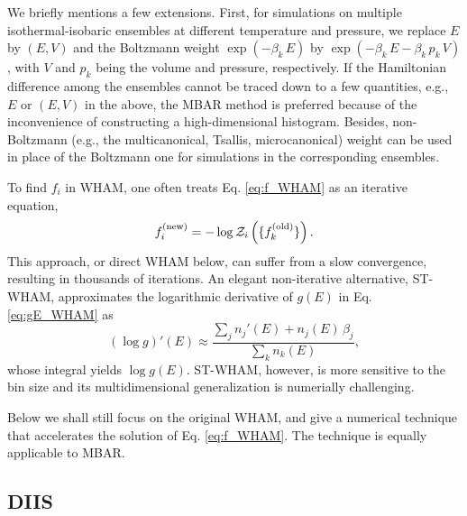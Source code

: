 \documentclass[reprint,superscriptaddress]{revtex4-1}
\begin{document}
We briefly mentions a few extensions.
%
First,
for simulations
on multiple isothermal-isobaric ensembles
at different temperature and pressure,
%
we replace $E$ by $(E, V)$
and the Boltzmann weight
$\exp(-\beta_k \, E)$
by
$\exp(-\beta_k \, E - \beta_k \, p_k \, V)$,
with
$V$ and $p_k$
being the volume and pressure,
respectively.
%
If the Hamiltonian difference among the ensembles
cannot be traced down to a few quantities,
e.g., $E$ or $(E, V)$ in the above,
the MBAR method is preferred\cite{
shirts2008}
because of the inconvenience
of constructing a high-dimensional histogram.
%
Besides,
non-Boltzmann
(e.g., the multicanonical\cite{
mezei1987, *berg1992, *lee1993},
Tsallis\cite{tsallis1988},
microcanonical\cite{
yan2003, *martin-mayor2007, *zhang2013})
weight
can be used in place of the Boltzmann one
for simulations in the corresponding ensembles.
%



To find $f_i$ in WHAM,
one often treats Eq. \eqref{eq:f_WHAM}
as an iterative equation,
%
\begin{equation*}
f_i^\mathrm{(new)}
=
-\log \mathcal{Z}_i\left(
  \{ f_k^\mathrm{(old)} \}
\right).
\end{equation*}
%
This approach, or direct WHAM below,
can suffer from a slow convergence,
resulting in thousands of iterations\cite{
bereau2009, kim2011}.
%
An elegant non-iterative alternative, ST-WHAM,
approximates the logarithmic derivative of $g(E)$
in Eq. \eqref{eq:gE_WHAM} as\cite{
kim2011}
%
\begin{equation}
(\log g)'(E)
\approx
\frac{
  \sum_j n_j'(E) + n_j(E) \, \beta_j
}
{
  \sum_k n_k(E)
},
\label{eq:beta_STWHAM}
\end{equation}
%
whose integral yields $\log g(E)$.
%
ST-WHAM, however,
is more sensitive to the bin size
and its multidimensional generalization
is numerially challenging\cite{
kim2011}.



Below we shall still focus on the original WHAM,
and give a numerical technique
that accelerates the solution
of Eq. \eqref{eq:f_WHAM}.
%
The technique is equally applicable to MBAR.





\subsection{DIIS}
\end{document}
